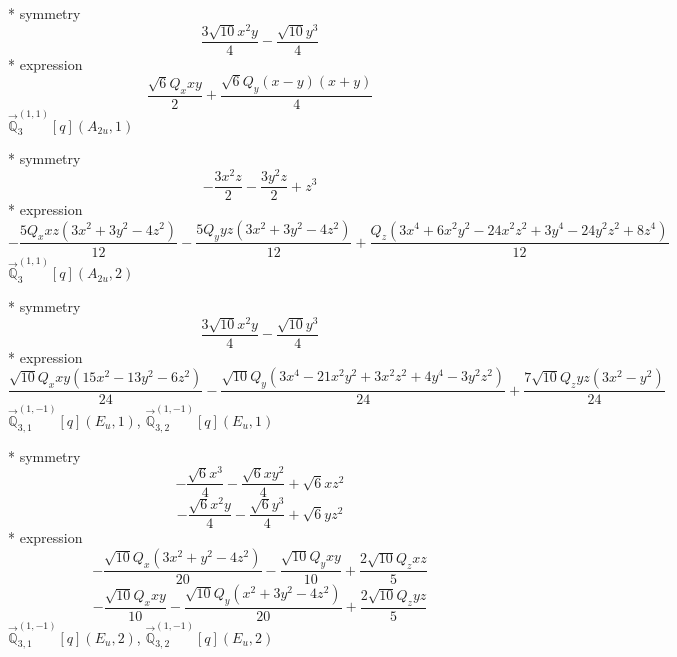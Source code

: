 \documentclass[fleqn,8pt]{jsarticle}
\begin{document}
\noindent\quad ** symmetry
\begin{dmath*}
\frac{3 \sqrt{10} x^{2} y}{4} - \frac{\sqrt{10} y^{3}}{4}
\end{dmath*}
\noindent\quad ** expression
\begin{dmath*}
\frac{\sqrt{6} Q_{x} x y}{2} + \frac{\sqrt{6} Q_{y} \left(x - y\right) \left(x + y\right)}{4}
\end{dmath*}
\noindent\quad $\vec{\mathbb{Q}}_{3}^{(1,1)}[q](A_{2u},1)$

\noindent\quad ** symmetry
\begin{dmath*}
- \frac{3 x^{2} z}{2} - \frac{3 y^{2} z}{2} + z^{3}
\end{dmath*}
\noindent\quad ** expression
\begin{dmath*}
- \frac{5 Q_{x} x z \left(3 x^{2} + 3 y^{2} - 4 z^{2}\right)}{12} - \frac{5 Q_{y} y z \left(3 x^{2} + 3 y^{2} - 4 z^{2}\right)}{12} + \frac{Q_{z} \left(3 x^{4} + 6 x^{2} y^{2} - 24 x^{2} z^{2} + 3 y^{4} - 24 y^{2} z^{2} + 8 z^{4}\right)}{12}
\end{dmath*}
\noindent\quad $\vec{\mathbb{Q}}_{3}^{(1,1)}[q](A_{2u},2)$

\noindent\quad ** symmetry
\begin{dmath*}
\frac{3 \sqrt{10} x^{2} y}{4} - \frac{\sqrt{10} y^{3}}{4}
\end{dmath*}
\noindent\quad ** expression
\begin{dmath*}
\frac{\sqrt{10} Q_{x} x y \left(15 x^{2} - 13 y^{2} - 6 z^{2}\right)}{24} - \frac{\sqrt{10} Q_{y} \left(3 x^{4} - 21 x^{2} y^{2} + 3 x^{2} z^{2} + 4 y^{4} - 3 y^{2} z^{2}\right)}{24} + \frac{7 \sqrt{10} Q_{z} y z \left(3 x^{2} - y^{2}\right)}{24}
\end{dmath*}
\noindent\quad $\vec{\mathbb{Q}}_{3,1}^{(1,-1)}[q](E_{u},1)$, $\vec{\mathbb{Q}}_{3,2}^{(1,-1)}[q](E_{u},1)$

\noindent\quad ** symmetry
\begin{dmath*}
- \frac{\sqrt{6} x^{3}}{4} - \frac{\sqrt{6} x y^{2}}{4} + \sqrt{6} x z^{2}
\end{dmath*}
\begin{dmath*}
- \frac{\sqrt{6} x^{2} y}{4} - \frac{\sqrt{6} y^{3}}{4} + \sqrt{6} y z^{2}
\end{dmath*}
\noindent\quad ** expression
\begin{dmath*}
- \frac{\sqrt{10} Q_{x} \left(3 x^{2} + y^{2} - 4 z^{2}\right)}{20} - \frac{\sqrt{10} Q_{y} x y}{10} + \frac{2 \sqrt{10} Q_{z} x z}{5}
\end{dmath*}
\begin{dmath*}
- \frac{\sqrt{10} Q_{x} x y}{10} - \frac{\sqrt{10} Q_{y} \left(x^{2} + 3 y^{2} - 4 z^{2}\right)}{20} + \frac{2 \sqrt{10} Q_{z} y z}{5}
\end{dmath*}
\noindent\quad $\vec{\mathbb{Q}}_{3,1}^{(1,-1)}[q](E_{u},2)$, $\vec{\mathbb{Q}}_{3,2}^{(1,-1)}[q](E_{u},2)$
\end{document}
